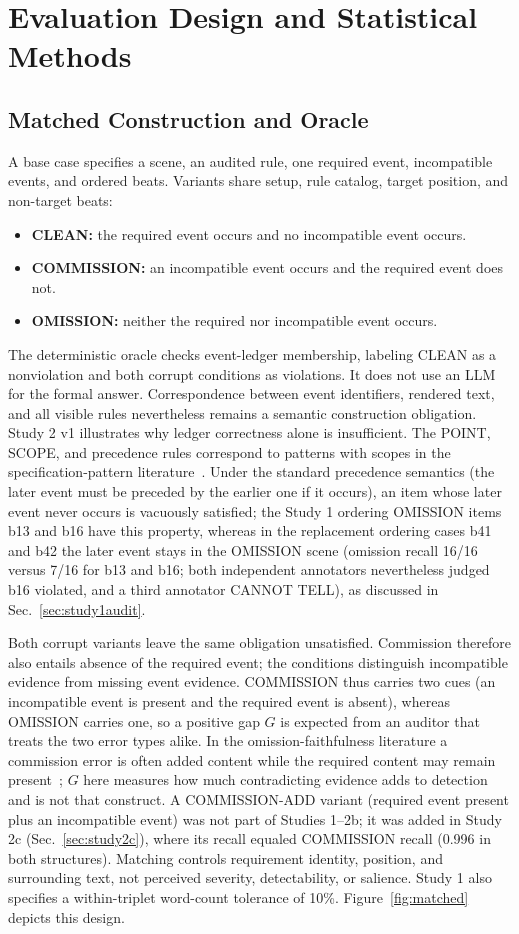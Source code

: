 \documentclass{ieeeaccess}
\begin{document}
\section{Evaluation Design and Statistical Methods}
\subsection{Matched Construction and Oracle}
A base case specifies a scene, an audited rule, one required event, incompatible events, and ordered beats. Variants share setup, rule catalog, target position, and non-target beats:
\begin{itemize}
\item \textbf{CLEAN:} the required event occurs and no incompatible event occurs.
\item \textbf{COMMISSION:} an incompatible event occurs and the required event does not.
\item \textbf{OMISSION:} neither the required nor incompatible event occurs.
\end{itemize}
The deterministic oracle checks event-ledger membership, labeling CLEAN as a nonviolation and both corrupt conditions as violations. It does not use an LLM for the formal answer. Correspondence between event identifiers, rendered text, and all visible rules nevertheless remains a semantic construction obligation. Study 2 v1 illustrates why ledger correctness alone is insufficient. The POINT, SCOPE, and precedence rules correspond to patterns with scopes in the specification-pattern literature~\cite{dwyer1999patterns}. Under the standard precedence semantics (the later event must be preceded by the earlier one if it occurs), an item whose later event never occurs is vacuously satisfied; the Study 1 ordering OMISSION items b13 and b16 have this property, whereas in the replacement ordering cases b41 and b42 the later event stays in the OMISSION scene (omission recall 16/16 versus 7/16 for b13 and b16; both independent annotators nevertheless judged b16 violated, and a third annotator CANNOT TELL), as discussed in Sec.~\ref{sec:study1audit}.

Both corrupt variants leave the same obligation unsatisfied. Commission therefore also entails absence of the required event; the conditions distinguish incompatible evidence from missing event evidence. COMMISSION thus carries two cues (an incompatible event is present and the required event is absent), whereas OMISSION carries one, so a positive gap $G$ is expected from an auditor that treats the two error types alike. In the omission-faithfulness literature a commission error is often added content while the required content may remain present~\cite{fox2026omission,chen2026enumerating}; $G$ here measures how much contradicting evidence adds to detection and is not that construct. A COMMISSION-ADD variant (required event present plus an incompatible event) was not part of Studies 1--2b; it was added in Study 2c (Sec.~\ref{sec:study2c}), where its recall equaled COMMISSION recall (0.996 in both structures). Matching controls requirement identity, position, and surrounding text, not perceived severity, detectability, or salience. Study 1 also specifies a within-triplet word-count tolerance of 10\%. Figure~\ref{fig:matched} depicts this design.
\end{document}
